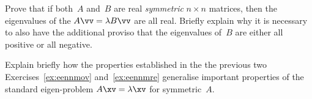 \begin{exercise} \label{ex:eennmre} 
Prove that if both~\(A\) and~\(B\) are real \emph{symmetric} \(n\times n\) matrices, then the eigenvalues of the  \(A\vv=\lambda B\vv\) are all real.
Briefly explain why it is necessary to also have the additional proviso that the eigenvalues of~\(B\) are either all positive or all negative.
\end{exercise}


\begin{exercise} \label{ex:} 
Explain briefly how the properties established in the the previous two Exercises~\ref{ex:eennmov} and~\ref{ex:eennmre} generalise important properties of the standard eigen-problem \(A\xv=\lambda\xv\) for symmetric~\(A\).
\end{exercise}







